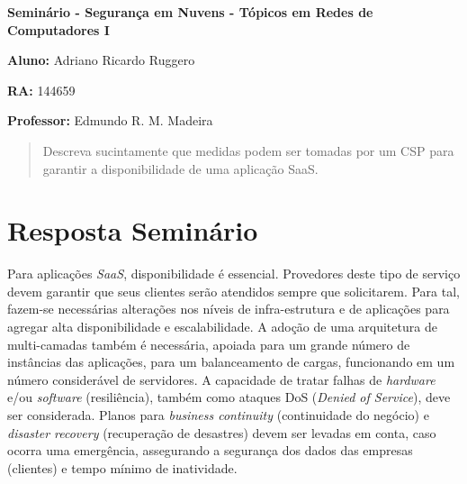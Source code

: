 \documentclass[12pt,twoside,a4paper]{article}
\begin{document}
\vskip 15mm

\begin{center} 
\textbf{Seminário  - Segurança em Nuvens - Tópicos em Redes de Computadores I}

\end{center}

\vskip 5mm

\textbf{Aluno:} Adriano Ricardo Ruggero

\textbf{RA:} 144659

\textbf{Professor:} Edmundo R. M. Madeira

\vskip 20mm

\begin{abstract}

Descreva sucintamente que medidas podem
ser tomadas por um CSP para garantir a
disponibilidade de uma aplicação SaaS.


\end{abstract}

\newpage
\pagestyle{plain}
\headheight 0.0cm
\headsep 0.0cm
\footskip 2.2cm

\section{Resposta Seminário}
\label{sec:01}

Para aplicações \textit{SaaS}, disponibilidade é essencial. Provedores deste tipo de serviço devem  garantir que   seus clientes serão atendidos sempre que solicitarem. Para tal, fazem-se necessárias alterações nos níveis de infra-estrutura e de aplicações para agregar alta disponibilidade e escalabilidade. A adoção de uma arquitetura de multi-camadas também é necessária, apoiada para um grande número de instâncias das aplicações, para um balanceamento de cargas, funcionando em um número considerável de servidores.
A capacidade de tratar falhas de \textit{hardware} e/ou \textit{software} (resiliência), também como ataques DoS (\textit{Denied of Service}), deve ser considerada.
Planos para \textit{business continuity} (continuidade do negócio) e \textit{disaster recovery} (recuperação de desastres) devem ser levadas em conta, caso ocorra uma emergência, assegurando a segurança dos dados das empresas (clientes) e tempo mínimo de inatividade\cite{Subashini:2011:RSS:1889383.1889415}.



\end{document}
